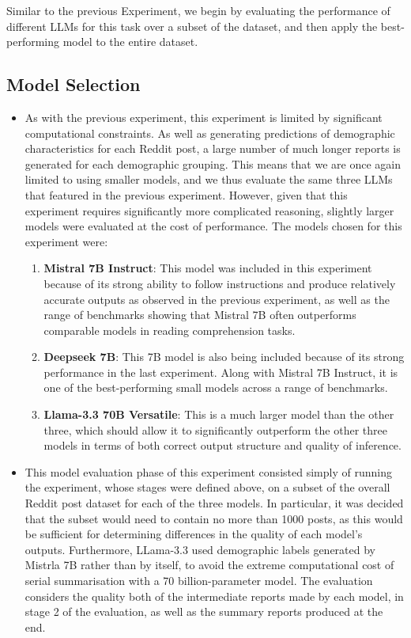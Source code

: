 \documentclass{report}
\begin{document}
Similar to the previous Experiment, we begin by evaluating the performance of different LLMs for this task over a subset of the dataset, and then apply the best-performing model to the entire dataset.


\subsection{Model Selection}

\begin{itemize}
\item As with the previous experiment, this experiment is limited by significant computational constraints. As well as generating predictions of demographic characteristics for each Reddit post, a large number of much longer reports is generated for each demographic grouping. This means that we are once again limited to using smaller models, and we thus evaluate the same three LLMs that featured in the previous experiment. However, given that this experiment requires significantly more complicated reasoning, slightly larger models were evaluated at the cost of performance. The models chosen for this experiment were:

\begin{enumerate}
\item \textbf{Mistral 7B Instruct}: This model was included in this experiment because of its strong ability to follow instructions and produce relatively accurate outputs as observed in the previous experiment, as well as the range of benchmarks showing that Mistral 7B often outperforms comparable models in reading comprehension tasks.

\item \textbf{Deepseek 7B}: This 7B model is also being included because of its strong performance in the last experiment. Along with Mistral 7B Instruct, it is one of the best-performing small models across a range of benchmarks.

\item \textbf{Llama-3.3 70B Versatile}: This is a much larger model than the other three, which should allow it to significantly outperform the other three models in terms of both correct output structure and quality of inference.
\end{enumerate}

\item This model evaluation phase of this experiment consisted simply of running the experiment, whose stages were defined above, on a subset of the overall Reddit post dataset for each of the three models. In particular, it was decided that the subset would need to contain no more than 1000 posts, as this would be sufficient for determining differences in the quality of each model's outputs. Furthermore, LLama-3.3 used demographic labels generated by Mistrla 7B rather than by itself, to avoid the extreme computational cost of serial summarisation with a 70 billion-parameter model. The evaluation considers the quality both of the intermediate reports made by each model, in stage 2 of the evaluation, as well as the summary reports produced at the end.


\end{itemize}
\end{document}
